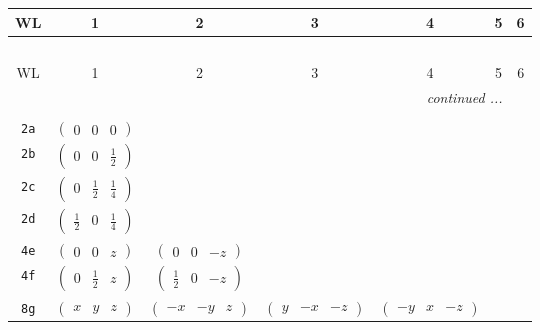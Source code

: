 \documentclass[fleqn,9pt,landscape]{jsarticle}
\begin{document}
\begin{center}
\renewcommand{\arraystretch}{1.2}
\begin{longtable}{ccccccc}
 \hline \hline
WL & 1 & 2 & 3 & 4 & 5 & 6 \\ \hline \endfirsthead

\multicolumn{6}{l}{\tablename\ \thetable{}} \\
 \hline \hline
WL & 1 & 2 & 3 & 4 & 5 & 6 \\ \hline \endhead

 \hline \hline
\multicolumn{6}{r}{\footnotesize\it continued ...} \\ \endfoot

 \hline \hline
\multicolumn{6}{r}{} \\ \endlastfoot

{\tt 2a} & $ \begin{pmatrix} 0 & 0 & 0 \end{pmatrix} $ & $  $ & $  $ & $  $ \\ \hline
{\tt 2b} & $ \begin{pmatrix} 0 & 0 & \frac{1}{2} \end{pmatrix} $ & $  $ & $  $ & $  $ \\ \hline
{\tt 2c} & $ \begin{pmatrix} 0 & \frac{1}{2} & \frac{1}{4} \end{pmatrix} $ & $  $ & $  $ & $  $ \\ \hline
{\tt 2d} & $ \begin{pmatrix} \frac{1}{2} & 0 & \frac{1}{4} \end{pmatrix} $ & $  $ & $  $ & $  $ \\ \hline
{\tt 4e} & $ \begin{pmatrix} 0 & 0 & z \end{pmatrix} $ & $ \begin{pmatrix} 0 & 0 & - z \end{pmatrix} $ & $  $ & $  $ \\ \hline
{\tt 4f} & $ \begin{pmatrix} 0 & \frac{1}{2} & z \end{pmatrix} $ & $ \begin{pmatrix} \frac{1}{2} & 0 & - z \end{pmatrix} $ & $  $ & $  $ \\ \hline
{\tt 8g} & $ \begin{pmatrix} x & y & z \end{pmatrix} $ & $ \begin{pmatrix} - x & - y & z \end{pmatrix} $ & $ \begin{pmatrix} y & - x & - z \end{pmatrix} $ & $ \begin{pmatrix} - y & x & - z \end{pmatrix} $ \\
\end{longtable}
\end{center}
\end{document}
